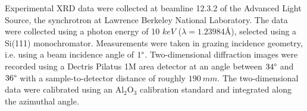 Experimental XRD data were collected at beamline 12.3.2 of the Advanced Light Source, the synchrotron at Lawrence Berkeley National Laboratory. The data were collected using a photon energy of 10 $\si{keV}$ ($\lambda = 1.23984 \text{\AA}$), selected using a Si(111) monochromator. Measurements were taken in grazing incidence geometry, i.e. using a beam incidence angle of $1\degree$. Two-dimensional diffraction images were recorded using a Dectris Pilatus 1M area detector at an angle between $34\degree$ and $36\degree$ with a sample-to-detector distance of roughly $190 \ \si{mm}$. The two-dimensional data were calibrated using an Al$_{2}$O$_{3}$ calibration standard and integrated along the azimuthal angle. \\



